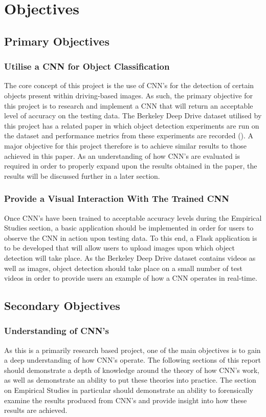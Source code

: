 \documentclass[12pt]{report}
\begin{document}
\section{Objectives}
\vspace{0.5cm}
\subsection{Primary Objectives}
\subsubsection*{Utilise a CNN for Object Classification}
The core concept of this project is the use of CNN's for the detection of certain objects present within driving-based images. As such, the primary objective for this project is to research and implement a CNN that will return an acceptable level of accuracy on the testing data. The Berkeley Deep Drive dataset utilised by this project has a related paper in which object detection experiments are run on the dataset and performance metrics from these experiments are recorded (\cite{yu2018bdd100k}). A major objective for this project therefore is to achieve similar results to those achieved in this paper. As an understanding of how CNN's are evaluated is required in order to properly expand upon the results obtained in the paper, the results will be discussed further in a later section.
\subsubsection*{Provide a Visual Interaction With The Trained CNN}
\begin{flushleft}
Once CNN's have been trained to acceptable accuracy levels during the Empirical Studies section, a basic application should be implemented in order for users to observe the CNN in action upon testing data. To this end, a Flask application is to be developed that will allow users to upload images upon which object detection will take place. As the Berkeley Deep Drive dataset contains videos as well as images, object detection should take place on a small number of test videos in order to provide users an example of how a CNN operates in real-time.
\end{flushleft}
\subsection{Secondary Objectives}
\subsubsection*{Understanding of CNN's}
As this is a primarily research based project, one of the main objectives is to gain a deep understanding of how CNN's operate. The following sections of this report should demonstrate a depth of knowledge around the theory of how CNN's work, as well as demonstrate an ability to put these theories into practice. The section on Empirical Studies in particular should demonstrate an ability to forensically examine the results produced from CNN's and provide insight into how these results are achieved.
\vspace{0.5cm}
\end{document}
